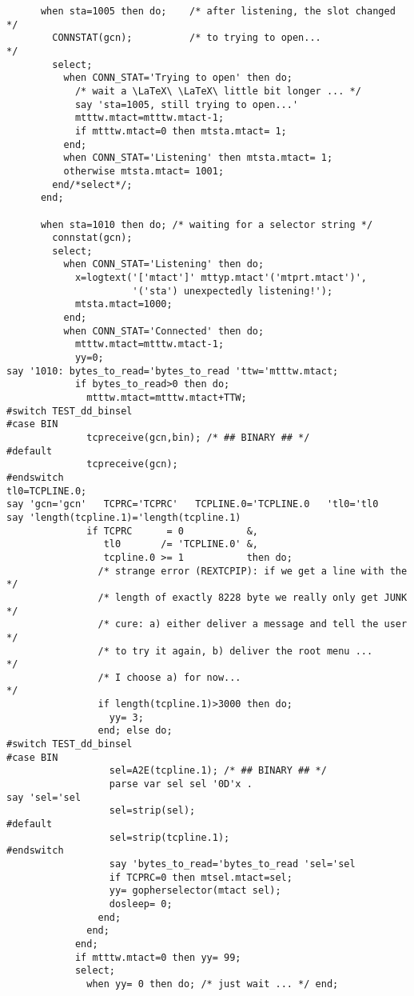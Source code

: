 \begin{verbatim}
      when sta=1005 then do;    /* after listening, the slot changed   */
        CONNSTAT(gcn);          /* to trying to open...                */
        select;
          when CONN_STAT='Trying to open' then do;
            /* wait a \LaTeX\ \LaTeX\ little bit longer ... */
            say 'sta=1005, still trying to open...'
            mtttw.mtact=mtttw.mtact-1;
            if mtttw.mtact=0 then mtsta.mtact= 1;
          end;
          when CONN_STAT='Listening' then mtsta.mtact= 1;
          otherwise mtsta.mtact= 1001;
        end/*select*/;
      end;

      when sta=1010 then do; /* waiting for a selector string */
        connstat(gcn);
        select;
          when CONN_STAT='Listening' then do;
            x=logtext('['mtact']' mttyp.mtact'('mtprt.mtact')',
                      '('sta') unexpectedly listening!');
            mtsta.mtact=1000;
          end;
          when CONN_STAT='Connected' then do;
            mtttw.mtact=mtttw.mtact-1;
            yy=0;
say '1010: bytes_to_read='bytes_to_read 'ttw='mtttw.mtact;
            if bytes_to_read>0 then do;
              mtttw.mtact=mtttw.mtact+TTW;
#switch TEST_dd_binsel
#case BIN
              tcpreceive(gcn,bin); /* ## BINARY ## */
#default
              tcpreceive(gcn);
#endswitch
tl0=TCPLINE.0;
say 'gcn='gcn'   TCPRC='TCPRC'   TCPLINE.0='TCPLINE.0   'tl0='tl0
say 'length(tcpline.1)='length(tcpline.1)
              if TCPRC      = 0           &,
                 tl0       /= 'TCPLINE.0' &,
                 tcpline.0 >= 1           then do;
                /* strange error (REXTCPIP): if we get a line with the */
                /* length of exactly 8228 byte we really only get JUNK */
                /* cure: a) either deliver a message and tell the user */
                /* to try it again, b) deliver the root menu ...       */
                /* I choose a) for now...                              */
                if length(tcpline.1)>3000 then do;
                  yy= 3;
                end; else do;
#switch TEST_dd_binsel
#case BIN
                  sel=A2E(tcpline.1); /* ## BINARY ## */
                  parse var sel sel '0D'x .
say 'sel='sel
                  sel=strip(sel);
#default
                  sel=strip(tcpline.1);
#endswitch
                  say 'bytes_to_read='bytes_to_read 'sel='sel
                  if TCPRC=0 then mtsel.mtact=sel;
                  yy= gopherselector(mtact sel);
                  dosleep= 0;
                end;
              end;
            end;
            if mtttw.mtact=0 then yy= 99;
            select;
              when yy= 0 then do; /* just wait ... */ end;

\end{verbatim}
